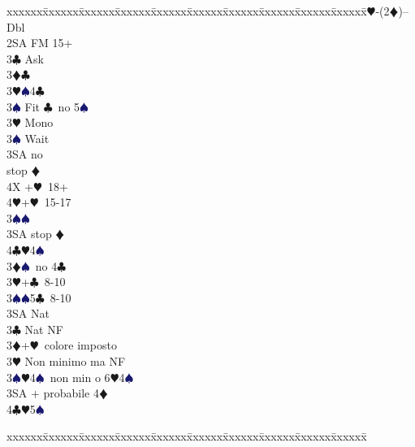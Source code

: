 \documentclass[a4paper,italian]{article}
\newcommand{\BC}{\textcolor{OliveGreen}{$\clubsuit$}}
\newcommand{\BD}{\textcolor{RedOrange}{$\vardiamondsuit$}}
\newcommand{\BH}{\textcolor{Red2}{$\varheartsuit${}}}
\newcommand{\BS}{\textcolor{MidnightBlue}{$\spadesuit${}}}
\newenvironment{bidtable}
{\begin{tabbing}

    xxxxxx\=xxxxxx\=xxxxxx\=xxxxxx\=xxxxxx\=xxxxxx\=xxxxxx\=xxxxxx\=xxxxxx\=xxxxxx\=\kill}
{\end{tabbing} }%
\begin{document}
\begin{multicols}{2}
                                        \begin{bidtable}
                                            1\BH-(2\BD)--\+\\
                                            Dbl\+\\
                                            2SA \> FM 15+\+\\
                                            3\BC \> Ask\+\\
                                            3\BD {}\BC \+\\
                                            3\BH {}\BS 4\BC \\
                                            3\BS \> Fit \BC\ no 5\BS \-\\
                                            3\BH \> Mono\+\\
                                            3\BS \> Wait\+\\
                                            3SA  no\+\\\-stop \BD \\
                                            4X +\BH\ 18+\\
                                            4\BH {}+\BH\ 15-17\-\-\\
                                            3\BS {}\BS \\
                                            3SA  stop \BD \\
                                            4\BC {}\BH 4\BS \-\\
                                            3\BD {}\BS\ no 4\BC \\
                                            3\BH {}+\BC\ 8-10\\
                                            3\BS {}\BS 5\BC\ 8-10\\
                                            3SA \> Nat\-\\
                                            3\BC \> Nat NF\\
                                            3\BD {}+\BH\ colore imposto\\
                                            3\BH \> Non minimo ma NF\\
                                            3\BS {}\BH 4\BS\ non min o 6\BH 4\BS \\
                                            3SA + probabile 4\BD \\
                                            4\BC {}\BH 5\BS \-\\
                                            \end{bidtable}
                                            \columnbreak
                                            \begin{bidtable}
                                                

\end{bidtable}
\end{multicols}
\end{document}
